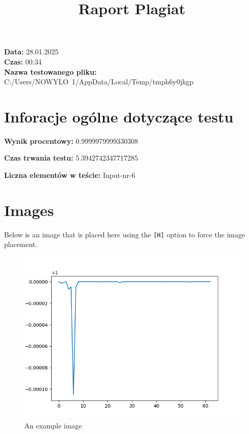 \documentclass{article}
\title{Raport Plagiat}
\date{}
\begin{document}
\maketitle

\begin{center}
    \textbf{Data:} 28.01.2025 \\
    \textbf{Czas:} 00:34 \\
    \textbf{Nazwa testowanego pliku:} C:/Users/NOWYLO~1/AppData/Local/Temp/tmph6y0jkgp
\end{center}

\section{Inforacje ogólne dotyczące testu}

\textbf{Wynik procentowy:} 0.9999979999330308

\textbf{Czas trwania testu:} 5.3942742347717285

\textbf{Liczna elementów w teście:} Input-nr-6


\section{Images}

Below is an image that is placed here using the \texttt{[H]} option to force the image placement.

\begin{figure}[H]
\centering
\includegraphics[width=1\textwidth]{ elements/plot0.png }
\caption{An example image}
\end{figure}
\end{document}
